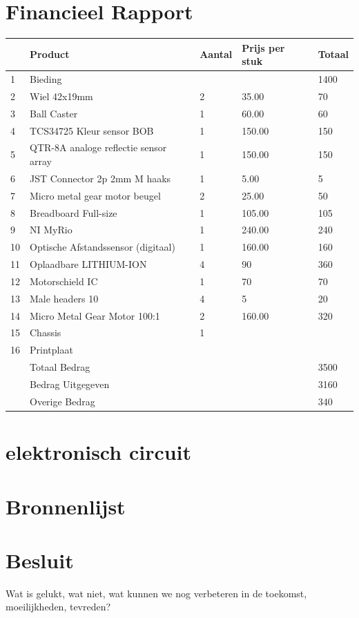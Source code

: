 \documentclass[twoside,kulak]{kulakreport} %
\begin{document}
	\section{Financieel Rapport}
			\begin{tabular}{  l | l | l | l | l }
			
			& Product & Aantal & Prijs per stuk & Totaal  \\ \hline
			1 & Bieding & & & 1400 \\ \hline
			2 & Wiel 42x19mm & 2 & 35.00 & 70 \\ \hline
			3 & Ball Caster & 1 & 60.00 & 60   \\ \hline
			4 & TCS34725 Kleur sensor BOB  & 1 & 150.00 & 150   \\ \hline
			5 & QTR-8A analoge reflectie sensor array & 1 & 150.00 & 150 \\ \hline
			6 & JST Connector 2p 2mm M haaks & 1 & 5.00 & 5 \\ \hline	
			7 & Micro metal gear motor beugel & 2 & 25.00 & 50 \\ \hline
			8 & Breadboard Full-size & 1 & 105.00 & 105   \\ \hline
			9 & NI MyRio & 1 & 240.00 & 240 \\ \hline
			10 & Optische Afstandssensor (digitaal) & 1 & 160.00 & 160  \\ \hline
			11 & Oplaadbare LITHIUM-ION & 4 & 90 & 360 \\ \hline
			12 & Motorschield IC & 1 & 70 & 70  \\ \hline
			13 & Male headers 10 & 4 & 5 & 20   \\ \hline
			14 & Micro Metal Gear Motor 100:1 & 2 & 160.00 & 320 \\ \hline
			15 & Chassis & 1 & & \\ \hline
			16 & Printplaat & & &  \\ \hline
			& Totaal Bedrag & & & 3500\\ 
			& Bedrag Uitgegeven & & & 3160 \\ 
			& Overige Bedrag & & & 340
			
		\end{tabular}
		
	\section{elektronisch circuit}
	\section{Bronnenlijst}
	
	\section*{Besluit}
	Wat is gelukt, wat niet, wat kunnen we nog verbeteren in de toekomst, moeilijkheden, tevreden?
\end{document}
